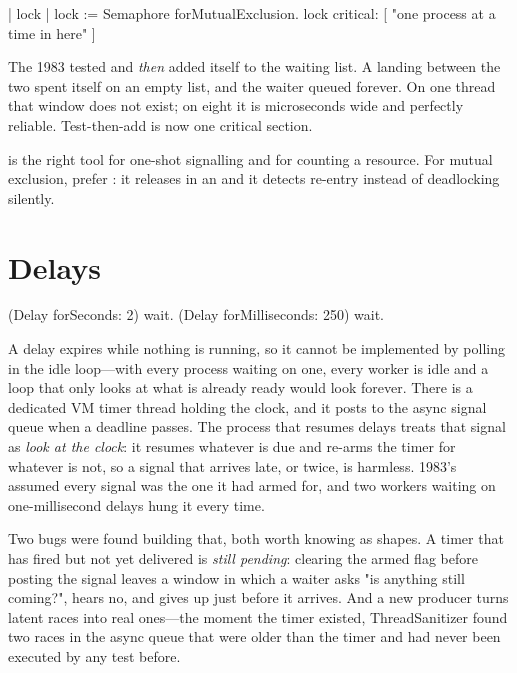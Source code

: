 \begin{st}
| lock |
lock := Semaphore forMutualExclusion.
lock critical: [ "one process at a time in here" ]
\end{st}

\begin{stnote}
The 1983  tested  and \emph{then} added itself to
the waiting list. A  landing between the two spent itself on an
empty list, and the waiter queued forever. On one thread that window does not
exist; on eight it is microseconds wide and perfectly reliable. Test-then-add
is now one critical section.
\end{stnote}

 is the right tool for one-shot signalling and for counting a
resource. For mutual exclusion, prefer : it releases in an
 and it detects re-entry instead of deadlocking silently.

\section{Delays}

\begin{st}
(Delay forSeconds: 2) wait.
(Delay forMilliseconds: 250) wait.
\end{st}

A delay expires while nothing is running, so it cannot be implemented by
polling in the idle loop---with every process waiting on one, every worker is
idle and a loop that only looks at what is already ready would look forever.
There is a dedicated VM timer thread holding the clock, and it posts to the
async signal queue when a deadline passes. The process that resumes delays
treats that signal as \emph{look at the clock}: it resumes whatever is due
and re-arms the timer for whatever is not, so a signal that arrives late, or
twice, is harmless. 1983's assumed every signal was the one it had armed for,
and two workers waiting on one-millisecond delays hung it every time.

\begin{stnote}
Two bugs were found building that, both worth knowing as shapes. A timer that
has fired but not yet delivered is \emph{still pending}: clearing the armed
flag before posting the signal leaves a window in which a waiter asks "is
anything still coming?", hears no, and gives up just before it arrives. And a
new producer turns latent races into real ones---the moment the timer existed,
ThreadSanitizer found two races in the async queue that were older than the
timer and had never been executed by any test before.
\end{stnote}

